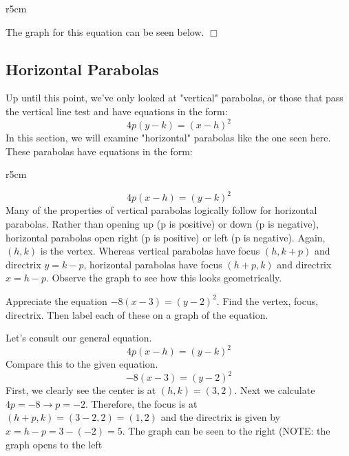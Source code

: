 \documentclass[lang=en,11pt]{elegantbook}
\begin{document}
\begin{wrapfigure}{r}{5cm}
\end{wrapfigure}

The graph for this equation can be seen below. $\Box$
\subsection{Horizontal Parabolas}
\noindent Up until this point, we've only looked at "vertical" parabolas, or those that pass the vertical line test and have equations in the form:
$$ 4p(y-k) = (x-h)^2 $$
In this section, we will examine "horizontal" parabolas like the one seen here.  These parabolas have equations in the form:

\begin{wrapfigure}{r}{5cm}
\end{wrapfigure}

$$ 4p(x-h) = (y-k)^2 $$
Many of the properties of vertical parabolas logically follow for horizontal parabolas.  Rather than opening up (p is positive) or down (p is negative), horizontal parabolas open right (p is positive) or left (p is negative).  Again, $(h,k)$ is the vertex.  Whereas vertical parabolas have focus $(h,k+p)$ and directrix $y=k-p$, horizontal parabolas have focus $(h+p,k)$ and directrix $x=h-p$.  Observe the graph to see how this looks geometrically.
\begin{example}
Appreciate the equation $-8(x-3)=(y-2)^2$.  Find the vertex, focus, directrix.  Then label each of these on a graph of the equation.  
\end{example}
\begin{solution}
Let's consult our general equation.
$$ 4p(x-h) = (y-k)^2 $$
Compare this to the given equation.
$$ -8(x-3) = (y-2)^2 $$
First, we clearly see the center is at $(h,k)=(3,2)$.  Next we calculate $4p = -8 \to p = -2$.  Therefore, the focus is at $(h+p,k) = (3-2,2) = (1,2)$ and the directrix is given by $x=h-p=3-(-2)=5$.  The graph can be seen to the right (NOTE: the graph opens to the left 
\end{solution}
\end{document}
